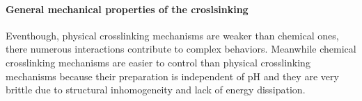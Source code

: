 \paragraph{General mechanical properties of the croslsinking}
Eventhough, physical crosslinking mechanisms are weaker than chemical ones, there numerous interactions contribute to complex behaviors.
Meanwhile chemical crosslinking mechanisms are easier to control than physical crosslinking mechanisms because their preparation is independent of pH\citep{bustamante-torresHydrogelsClassificationAccording2021} and they are very brittle due to structural inhomogeneity and lack of energy dissipation\citep{xuRoleChemicalPhysical2018}.


